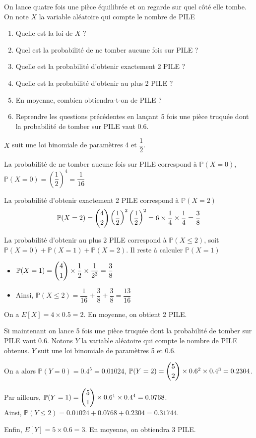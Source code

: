 \documentclass[11pt,fleqn, openany]{book} %
\begin{document}
\begin{exercise}[topic=prob12]
On lance quatre fois une pièce équilibrée et on regarde sur quel côté elle tombe. On note $X$ la variable aléatoire qui compte le nombre de PILE
\begin{enumerate}
\item Quelle est la loi de $X$ ?
\item Quel est la probabilité de ne tomber aucune fois sur PILE ?
\item Quelle est la probabilité d'obtenir exactement 2 PILE ?
\item Quelle est la probabilité d'obtenir au plus 2 PILE ?
\item En moyenne, combien obtiendra-t-on de PILE ?
\item Reprendre les questions précédentes en lançant 5 fois une pièce truquée dont la probabilité de tomber sur PILE vaut 0.6.
\end{enumerate}\end{exercise}

\begin{solution}$X$ suit une loi binomiale de paramètres 4 et $\dfrac{1}{2}$. 

La probabilité de ne tomber aucune fois sur PILE correspond à $\mathbb{P}(X=0)$, $\mathbb{P}(X=0)= \left(	\dfrac{1}{2}\right)^4 = \dfrac{1}{16}$

La probabilité d'obtenir exactement 2 PILE correspond à $\mathbb{P}(X=2)$
\[ \mathbb{P}(X=2) = \dbinom{4}{2} \left( \dfrac{1}{2}\right)^2 \left( \dfrac{1}{2}\right)^2=6 \times  \dfrac{1}{4} \times \dfrac{1}{4}=\dfrac{3}{8}\]

 La probabilité d'obtenir au plus 2 PILE correspond à $\mathbb{P}(X \leqslant 2)$, soit $\mathbb{P}(X=0)+\mathbb{P}(X=1)+\mathbb{P}(X=2)$. Il reste à calculer $\mathbb{P}(X=1)$
\begin{itemize}
\item $\mathbb{P}(X=1)= \dbinom{4}{1} \times \dfrac{1}{2} \times \dfrac{1}{2^3}=\dfrac{3}{8}$
\item Ainsi, $\mathbb{P}(X \leqslant 2)=\dfrac{1}{16}+\dfrac{3}{8}+\dfrac{3}{8}=\dfrac{13}{16}$
\end{itemize}

On a $E[X]=4 \times 0.5=2$. En moyenne, on obtient 2 PILE.

Si maintenant on lance 5 fois une pièce truquée dont la probabilité de tomber sur PILE vaut 0.6. Notons $Y$ la variable aléatoire qui compte le nombre de PILE obtenus. $Y$ suit une loi binomiale de paramètres 5 et 0.6. 

On a alors $\mathbb{P}(Y=0)=0.4^5=0.01024$, $\mathbb{P}(Y=2)= \dbinom{5}{2} \times 0.6^2\times 0.4^3=0.2304$.

Par ailleurs, $\mathbb{P}(Y=1)=\dbinom{5}{1} \times 0.6^1 \times 0.4^4 =0.0768$. \\Ainsi, $\mathbb{P}(Y \leqslant 2)=0.01024 + 0.0768+0.2304 =0.31744$.

Enfin, $E[Y]=5 \times 0.6 = 3$. En moyenne, on obtiendra 3 PILE. 
\end{solution}
\end{document}
